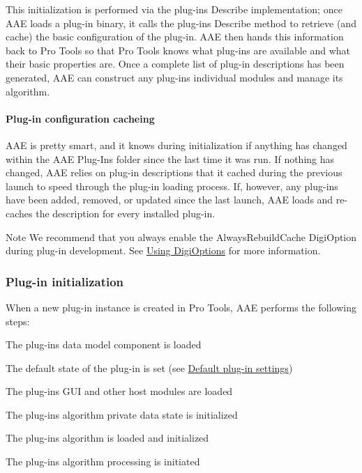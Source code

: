 This initialization is performed via the plug-\/in\textquotesingle{}s Describe implementation; once A\+A\+E loads a plug-\/in binary, it calls the plug-\/in\textquotesingle{}s Describe method to retrieve (and cache) the basic configuration of the plug-\/in. A\+A\+E then hands this information back to Pro Tools so that Pro Tools knows what plug-\/ins are available and what their basic properties are. Once a complete list of plug-\/in descriptions has been generated, A\+A\+E can construct any plug-\/in\textquotesingle{}s individual modules and manage its algorithm.

\hypertarget{a00360_subsubsection__plugin_configuration_cacheing_}{}\paragraph{Plug-\/in configuration cacheing}\label{a00360_subsubsection__plugin_configuration_cacheing_}
 A\+A\+E is pretty smart, and it knows during initialization if anything has changed within the A\+A\+E Plug-\/\+Ins folder since the last time it was run. If nothing has changed, A\+A\+E relies on plug-\/in descriptions that it cached during the previous launch to speed through the plug-\/in loading process. If, however, any plug-\/ins have been added, removed, or updated since the last launch, A\+A\+E loads and re-\/caches the description for every installed plug-\/in.

\begin{DoxyNote}{Note}
We recommend that you always enable the {\ttfamily Always\+Rebuild\+Cache} Digi\+Option during plug-\/in development. See \hyperlink{a00360_aax_pro_tools_guide_06c_digioptions}{Using Digi\+Options} for more information.
\end{DoxyNote}
\hypertarget{a00360_subsection__plugin_initialization}{}\subsubsection{Plug-\/in initialization}\label{a00360_subsection__plugin_initialization}
 When a new plug-\/in instance is created in Pro Tools, A\+A\+E performs the following steps\+: 
\begin{DoxyEnumerate}
\item The plug-\/in\textquotesingle{}s data model component is loaded  
\item The default state of the plug-\/in is set (see \hyperlink{a00360_subsubsection__default_plugin_settings_}{Default plug-\/in settings})  
\item The plug-\/in\textquotesingle{}s G\+U\+I and other host modules are loaded  
\item The plug-\/in\textquotesingle{}s algorithm private data state is initialized  
\item The plug-\/in\textquotesingle{}s algorithm is loaded and initialized  
\item The plug-\/in\textquotesingle{}s algorithm processing is initiated 
\end{DoxyEnumerate}

